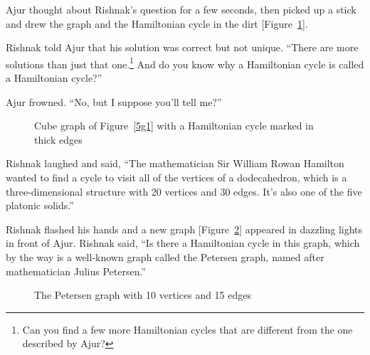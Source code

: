 Ajur thought about Rishnak's question for a few seconds, then picked up a stick and drew the graph and the Hamiltonian cycle in the dirt [Figure~\ref{5g2}].

Rishnak told Ajur that his solution was correct but not unique.  ``There are more solutions than just that one.\footnote{Can you find a few more Hamiltonian cycles that are different from the one described by Ajur?} And do you know why a Hamiltonian cycle is called a Hamiltonian cycle?''

Ajur frowned. ``No, but I suppose you'll tell me?''

\begin{figure}
\begin{center}
\caption{Cube graph of Figure~\ref{5g1} with a Hamiltonian cycle marked in thick edges}\label{5g2}
\end{center}
\end{figure}

Rishnak laughed and said, ``The mathematician Sir William Rowan Hamilton wanted to find a cycle to visit all of the vertices of a dodecahedron, which is a three-dimensional structure with 20 vertices and 30 edges. It's also one of the five platonic solids.''

Rishnak flashed his hands and a new graph [Figure~\ref{5g3}] appeared in dazzling lights in front of Ajur. Rishnak said, ``Is there a Hamiltonian cycle in this graph, which by the way is a well-known graph called the Petersen graph, named after mathematician Julius Petersen.''

\begin{figure}
\begin{center}
\caption{The Petersen graph with 10 vertices and 15 edges}\label{5g3}
\end{center}
\end{figure}

